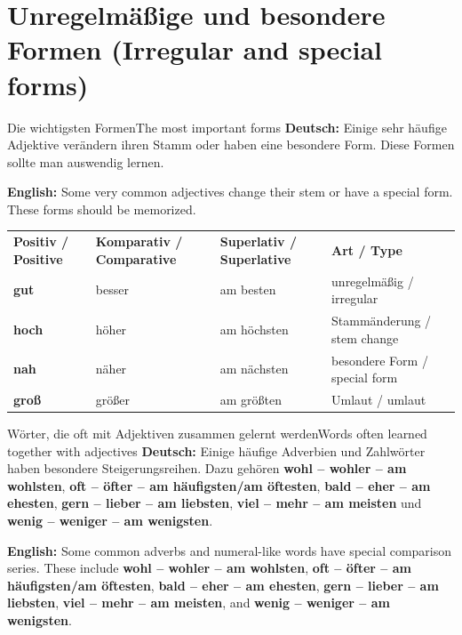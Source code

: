 \documentclass[a4paper,11pt]{article}
\newcommand{\GermanText}[1]{\textbf{Deutsch: }#1\par}
\newcommand{\EnglishText}[1]{{\small\color{SoftGray}\textbf{English: }#1\par}}
\begin{document}
\section{Unregelmäßige und besondere Formen \textnormal{(Irregular and special forms)}}

\begin{grammarentry}{Die wichtigsten Formen}{The most important forms}
\GermanText{Einige sehr häufige Adjektive verändern ihren Stamm oder haben eine besondere Form. Diese Formen sollte man auswendig lernen.}
\EnglishText{Some very common adjectives change their stem or have a special form. These forms should be memorized.}
\end{grammarentry}

\begin{longtable}{>{\bfseries}p{3.2cm}|p{3.6cm}|p{3.8cm}|p{3.2cm}}
\rowcolor{HeaderBlueDark}
\color{white}\textbf{Positiv / Positive} &
\color{white}\textbf{Komparativ / Comparative} &
\color{white}\textbf{Superlativ / Superlative} &
\color{white}\textbf{Art / Type} \\
gut & besser & am besten & unregelmäßig / irregular \\
hoch & höher & am höchsten & Stammänderung / stem change \\
nah & näher & am nächsten & besondere Form / special form \\
groß & größer & am größten & Umlaut / umlaut \\
\end{longtable}

\begin{grammarentry}{Wörter, die oft mit Adjektiven zusammen gelernt werden}{Words often learned together with adjectives}
\GermanText{Einige häufige Adverbien und Zahlwörter haben besondere Steigerungsreihen. Dazu gehören \textbf{wohl -- wohler -- am wohlsten}, \textbf{oft -- öfter -- am häufigsten/am öftesten}, \textbf{bald -- eher -- am ehesten}, \textbf{gern -- lieber -- am liebsten}, \textbf{viel -- mehr -- am meisten} und \textbf{wenig -- weniger -- am wenigsten}.}
\EnglishText{Some common adverbs and numeral-like words have special comparison series. These include \textbf{wohl -- wohler -- am wohlsten}, \textbf{oft -- öfter -- am häufigsten/am öftesten}, \textbf{bald -- eher -- am ehesten}, \textbf{gern -- lieber -- am liebsten}, \textbf{viel -- mehr -- am meisten}, and \textbf{wenig -- weniger -- am wenigsten}.}
\end{grammarentry}
\end{document}
